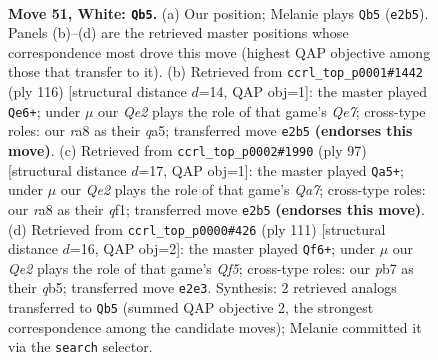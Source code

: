 \documentclass[11pt]{article}
\begin{document}
\clearpage

\begin{figure}[p]\centering
\begin{subfigure}{0.46\textwidth}\centering
\resizebox{\linewidth}{!}{%
\newchessgame
\chessboard[
  setfen={r7/1p6/4k3/8/4P3/8/4Q1PP/1K6 w - - 1 51},
  showmover=false,
  pgfstyle=straightmove, color=movearrow, markmove={e2-b5}
]}
\caption{}
\end{subfigure}\hfill
\begin{subfigure}{0.46\textwidth}\centering
\resizebox{\linewidth}{!}{%
\newchessgame
\chessboard[
  setfen={6k1/4Q3/6p1/q7/2p4P/6P1/8/6K1 w - - 10 59},
  showmover=false,
  pgfstyle=straightmove, color=movearrow, markmove={e7-e6}
]}
\caption{}
\end{subfigure}
\\[4pt]
\begin{subfigure}{0.46\textwidth}\centering
\resizebox{\linewidth}{!}{%
\newchessgame
\chessboard[
  setfen={8/7k/4p3/4P3/8/2K5/q7/5Q2 b - - 3 49},
  showmover=false,
  pgfstyle=straightmove, color=movearrow, markmove={a2-a5}
]}
\caption{}
\end{subfigure}\hfill
\begin{subfigure}{0.46\textwidth}\centering
\resizebox{\linewidth}{!}{%
\newchessgame
\chessboard[
  setfen={8/5p1k/P6p/1Q6/5q2/2K5/8/8 b - - 3 56},
  showmover=false,
  pgfstyle=straightmove, color=movearrow, markmove={f4-f6}
]}
\caption{}
\end{subfigure}
\caption{\textbf{Move 51, White: \texttt{Qb5}.} (a) Our position; Melanie plays \texttt{Qb5} (\texttt{e2b5}). Panels (b)--(d) are the retrieved master positions whose correspondence most drove this move (highest QAP objective among those that transfer to it). (b) Retrieved from \texttt{ccrl\_top\_p0001\#1442} (ply 116) [structural distance $d$=14, QAP obj=1]: the master played \texttt{Qe6+}; under $\mu$ our \emph{Qe2} plays the role of that game's \emph{Qe7}; cross-type roles: our \emph{r}a8 as their \emph{q}a5; transferred move \texttt{e2b5} \textbf{(endorses this move)}. (c) Retrieved from \texttt{ccrl\_top\_p0002\#1990} (ply 97) [structural distance $d$=17, QAP obj=1]: the master played \texttt{Qa5+}; under $\mu$ our \emph{Qe2} plays the role of that game's \emph{Qa7}; cross-type roles: our \emph{r}a8 as their \emph{q}f1; transferred move \texttt{e2b5} \textbf{(endorses this move)}. (d) Retrieved from \texttt{ccrl\_top\_p0000\#426} (ply 111) [structural distance $d$=16, QAP obj=2]: the master played \texttt{Qf6+}; under $\mu$ our \emph{Qe2} plays the role of that game's \emph{Qf5}; cross-type roles: our \emph{p}b7 as their \emph{q}b5; transferred move \texttt{e2e3}. Synthesis: 2 retrieved analogs transferred to \texttt{Qb5} (summed QAP objective 2, the strongest correspondence among the candidate moves); Melanie committed it via the \texttt{search} selector.}
\label{fig:thought-m100}
\end{figure}
\end{document}
